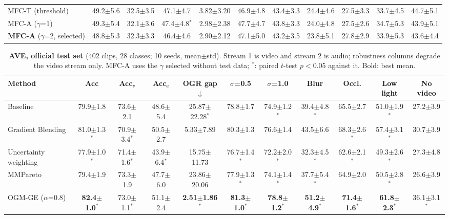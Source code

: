 \documentclass[fleqn,10pt]{wlscirep}
\newcommand{\pmm}{$\pm$}
\begin{document}
\begin{table}[t]
\begin{tabular}{@{}lcccccccccc@{}}
MFC-T (threshold) & 49.2$\pm$5.6 & 32.5$\pm$3.5 & 47.1$\pm$4.7 & 3.82$\pm$3.20 & 46.9$\pm$4.8 & 43.4$\pm$3.3 & 24.4$\pm$4.6 & 27.5$\pm$3.3 & 33.7$\pm$4.5 & 44.7$\pm$5.1 \\
MFC-A ($\gamma$=1) & 49.3$\pm$5.4 & 32.1$\pm$3.6 & 47.4$\pm$4.8$^{*}$ & 2.98$\pm$2.38 & 47.7$\pm$4.7 & 43.8$\pm$3.3 & 24.0$\pm$4.8 & 27.5$\pm$2.6 & 34.7$\pm$5.3 & 43.9$\pm$5.1 \\
\textbf{MFC-A} ($\gamma$=2, selected) & 48.8$\pm$5.3 & 32.3$\pm$3.3 & 46.4$\pm$4.6 & 2.90$\pm$2.12 & 47.1$\pm$5.0 & 43.2$\pm$3.5 & 23.8$\pm$5.1 & 27.8$\pm$2.9 & 33.9$\pm$5.3 & 43.6$\pm$4.4 \\
\bottomrule
\end{tabular}
\end{table}

\begin{table}[t]
\caption{\textbf{AVE, official test set} (402 clips, 28 classes; 10 seeds, mean\pmm std). Stream 1 is video and stream 2 is audio; robustness columns degrade the video stream only. MFC-A uses the $\gamma$ selected without test data; $^{*}$: paired $t$-test $p<0.05$ against it. Bold: best mean.}
\label{tab:main_ave}
\centering
\footnotesize
\setlength{\tabcolsep}{3pt}
\begin{tabular}{@{}lcccccccccc@{}}
\toprule
\textbf{Method} & \textbf{Acc} & \textbf{Acc$_v$} & \textbf{Acc$_a$} & \textbf{OGR gap}$\downarrow$ & \textbf{$\sigma$=0.5} & \textbf{$\sigma$=1.0} & \textbf{Blur} & \textbf{Occl.} & \textbf{Low light} & \textbf{No video} \\ \midrule
Baseline & 79.9$\pm$1.8 & 73.6$\pm$2.1 & 48.6$\pm$5.4 & 25.87$\pm$22.28$^{*}$ & 78.8$\pm$1.7 & 74.9$\pm$1.2$^{*}$ & 39.4$\pm$4.8$^{*}$ & 65.5$\pm$2.7 & 51.0$\pm$1.9$^{*}$ & 27.2$\pm$3.9 \\
Gradient Blending & 81.0$\pm$1.3$^{*}$ & 70.9$\pm$3.4$^{*}$ & 50.5$\pm$2.7 & 5.33$\pm$7.89 & 80.3$\pm$1.3 & 76.6$\pm$1.4 & 43.5$\pm$6.6 & 68.3$\pm$2.6$^{*}$ & 57.4$\pm$3.1$^{*}$ & 30.7$\pm$3.9 \\
Uncertainty weighting & 77.9$\pm$1.0$^{*}$ & 71.4$\pm$1.6$^{*}$ & 43.9$\pm$6.4$^{*}$ & 15.75$\pm$11.73 & 76.7$\pm$1.4$^{*}$ & 72.2$\pm$2.0$^{*}$ & 32.3$\pm$4.5$^{*}$ & 62.6$\pm$2.1$^{*}$ & 49.3$\pm$2.6$^{*}$ & 27.3$\pm$4.8 \\
MMPareto & 79.4$\pm$1.9 & 73.3$\pm$1.9 & 47.7$\pm$6.0 & 23.86$\pm$20.06 & 77.9$\pm$1.3$^{*}$ & 74.1$\pm$1.4$^{*}$ & 37.7$\pm$5.4$^{*}$ & 64.9$\pm$2.0 & 50.5$\pm$2.8$^{*}$ & 26.6$\pm$3.9 \\
OGM-GE ($\alpha$=0.8) & \textbf{82.4$\pm$1.0$^{*}$} & 73.0$\pm$1.1$^{*}$ & 51.1$\pm$2.4 & \textbf{2.51$\pm$1.86$^{*}$} & \textbf{81.3$\pm$1.0$^{*}$} & \textbf{78.8$\pm$1.2$^{*}$} & \textbf{51.2$\pm$4.9$^{*}$} & \textbf{71.4$\pm$1.6$^{*}$} & \textbf{61.8$\pm$2.3$^{*}$} & 36.1$\pm$3.1$^{*}$ \\

\end{tabular}
\end{table}
\end{document}
